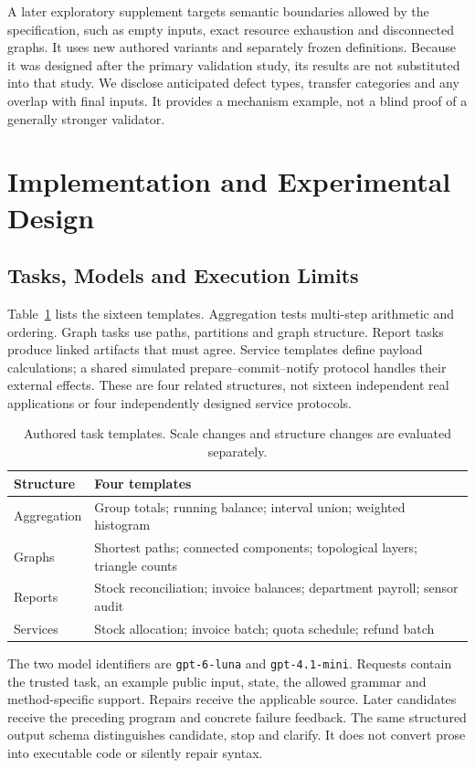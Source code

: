 \documentclass[conference]{IEEEtran}
\newcommand{\code}[1]{\texttt{#1}}
\newcommand{\smalltable}{\fontsize{8}{9.5}\selectfont}
\begin{document}
A later exploratory supplement targets semantic boundaries allowed by the specification, such as empty inputs, exact resource exhaustion and disconnected graphs. It uses new authored variants and separately frozen definitions. Because it was designed after the primary validation study, its results are not substituted into that study. We disclose anticipated defect types, transfer categories and any overlap with final inputs. It provides a mechanism example, not a blind proof of a generally stronger validator.

\section{Implementation and Experimental Design}
\subsection{Tasks, Models and Execution Limits}
Table~\ref{tab:tasks} lists the sixteen templates. Aggregation tests multi-step arithmetic and ordering. Graph tasks use paths, partitions and graph structure. Report tasks produce linked artifacts that must agree. Service templates define payload calculations; a shared simulated prepare--commit--notify protocol handles their external effects. These are four related structures, not sixteen independent real applications or four independently designed service protocols.

\begin{table}[t]
\centering\smalltable
\caption{Authored task templates. Scale changes and structure changes are evaluated separately.}
\label{tab:tasks}
\begin{tabular}{p{1.55cm}p{5.7cm}}
\toprule
Structure & Four templates \\
\midrule
Aggregation & Group totals; running balance; interval union; weighted histogram \\
Graphs & Shortest paths; connected components; topological layers; triangle counts \\
Reports & Stock reconciliation; invoice balances; department payroll; sensor audit \\
Services & Stock allocation; invoice batch; quota schedule; refund batch \\
\bottomrule
\end{tabular}
\end{table}

The two model identifiers are \code{gpt-6-luna} and \code{gpt-4.1-mini}. Requests contain the trusted task, an example public input, state, the allowed grammar and method-specific support. Repairs receive the applicable source. Later candidates receive the preceding program and concrete failure feedback. The same structured output schema distinguishes candidate, stop and clarify. It does not convert prose into executable code or silently repair syntax.
\end{document}
